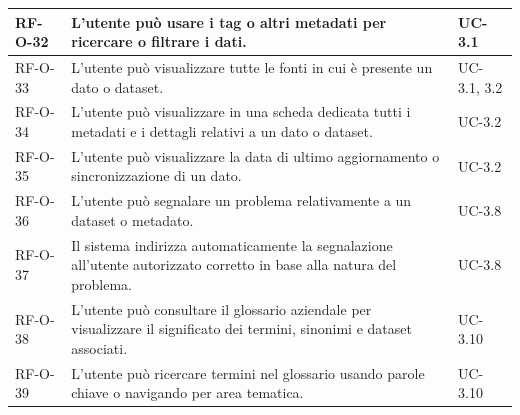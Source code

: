 \begin{longtable}{ p{} p{} p{} }
RF-O-32 & L'utente può usare i tag o altri metadati per ricercare o filtrare i dati. & UC-3.1 \\ \midrule
RF-O-33 & L'utente può visualizzare tutte le fonti in cui è presente un dato o dataset. & UC-3.1, 3.2 \\ \midrule
RF-O-34 & L'utente può visualizzare in una scheda dedicata tutti i metadati e i dettagli relativi a un dato o dataset. & UC-3.2 \\ \midrule
RF-O-35 & L'utente può visualizzare la data di ultimo aggiornamento o sincronizzazione di un dato. & UC-3.2 \\ \midrule
RF-O-36 & L'utente può segnalare un problema relativamente a un dataset o metadato. & UC-3.8 \\ \midrule
RF-O-37 & Il sistema indirizza automaticamente la segnalazione all'utente autorizzato corretto in base alla natura del problema. & UC-3.8 \\ \midrule
RF-O-38 & L'utente può consultare il glossario aziendale per visualizzare il significato dei termini, sinonimi e dataset associati. & UC-3.10 \\ \midrule
RF-O-39 & L'utente può ricercare termini nel glossario usando parole chiave o navigando per area tematica. & UC-3.10 \\ \midrule


\end{longtable}
